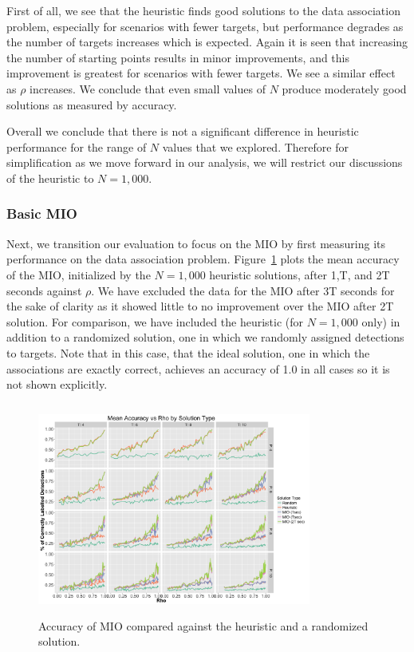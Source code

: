 \documentclass[journal]{IEEEtran}
\begin{document}
First of all, we see that the heuristic finds good solutions to the data association problem, especially for scenarios with fewer targets, but performance degrades as the number of targets increases which is expected. Again it is seen that increasing the number of starting points results in minor improvements, and this improvement is greatest for scenarios with fewer targets. We see a similar effect as $\rho$ increases. We conclude that even small values of $N$ produce moderately good solutions as measured by accuracy.

Overall we conclude that there is not a significant difference in heuristic performance for the range of $N$ values that we explored. Therefore for simplification as we move forward in our analysis, we will restrict our discussions of the heuristic to $N=1,000$.

\subsubsection{Basic MIO}
Next, we transition our evaluation to focus on the MIO by first measuring its performance on the data association problem. Figure~\ref{fig:Basic_Accuracy_Summary} plots the mean accuracy of the MIO, initialized by the $N=1,000$ heuristic solutions, after 1,T, and 2T seconds against $\rho$. We have excluded the data for the MIO after 3T seconds for the sake of clarity as it showed little to no improvement over the MIO after 2T solution. For comparison, we have included the heuristic (for $N=1,000$ only) in addition to a randomized solution, one in which we randomly assigned detections to targets. Note that in this case, that the ideal solution, one in which the associations are exactly correct, achieves an accuracy of 1.0 in all cases so it is not shown explicitly.

\begin{figure}[h]
  \centering  
  \includegraphics[width=9cm, height=7cm]{Basic_Accuracy_Summary}
  \caption{Accuracy of MIO compared against the heuristic and a randomized solution.}
  \label{fig:Basic_Accuracy_Summary}
\end{figure}
\end{document}
